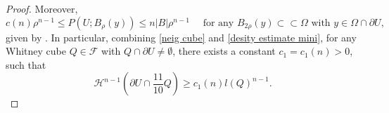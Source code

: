 \documentclass[reqno,11pt]{amsart}
\numberwithin{equation}{section}
\theoremstyle{remark}
\begin{document}
\begin{proof}
Moreover, 
\begin{equation}\label{desity estimate mini}
c(n)\rho^{n-1}\le P(U;B_\rho(y))\le n|B|\rho^{n-1} \quad \text{ for any  $B_{2\rho}(y)\subset\subset \Omega$ with $y\in \Omega\cap \partial U$},
\end{equation}
 given by \cite[Theorem 16.14]{M2012}.  
In particular,  combining \eqref{neig cube} and \eqref{desity estimate mini},  for any Whitney cube $Q\in \mathscr{F}$ with $Q\cap \partial U\neq \emptyset$, there exists a constant $c_1=c_1(n)>0$, such that  
 \begin{equation}\label{lower density min}
     \mathcal{H}^{n-1}\left(\partial  U\cap \frac{11}{10} Q\right)\ge c_1(n)l(Q)^{n-1}.
\end{equation}



\end{proof}
\end{document}
